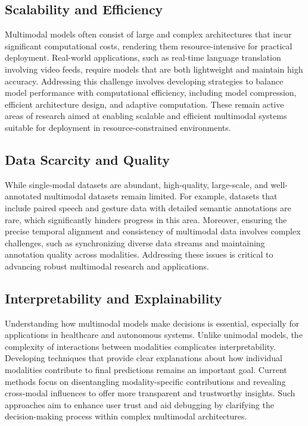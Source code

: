 \documentclass[sigconf]{acmart}
\begin{document}
\subsection{Scalability and Efficiency}
Multimodal models often consist of large and complex architectures that incur significant computational costs, rendering them resource-intensive for practical deployment. Real-world applications, such as real-time language translation involving video feeds, require models that are both lightweight and maintain high accuracy. Addressing this challenge involves developing strategies to balance model performance with computational efficiency, including model compression, efficient architecture design, and adaptive computation. These remain active areas of research aimed at enabling scalable and efficient multimodal systems suitable for deployment in resource-constrained environments.

\subsection{Data Scarcity and Quality}
While single-modal datasets are abundant, high-quality, large-scale, and well-annotated multimodal datasets remain limited. For example, datasets that include paired speech and gesture data with detailed semantic annotations are rare, which significantly hinders progress in this area. Moreover, ensuring the precise temporal alignment and consistency of multimodal data involves complex challenges, such as synchronizing diverse data streams and maintaining annotation quality across modalities. Addressing these issues is critical to advancing robust multimodal research and applications.

\subsection{Interpretability and Explainability}
Understanding how multimodal models make decisions is essential, especially for applications in healthcare and autonomous systems. Unlike unimodal models, the complexity of interactions between modalities complicates interpretability. Developing techniques that provide clear explanations about how individual modalities contribute to final predictions remains an important goal. Current methods focus on disentangling modality-specific contributions and revealing cross-modal influences to offer more transparent and trustworthy insights. Such approaches aim to enhance user trust and aid debugging by clarifying the decision-making process within complex multimodal architectures.
\end{document}
